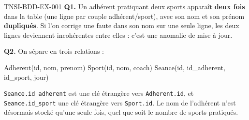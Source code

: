 \begin{corrige}{TNSI-BDD-EX-001}
\textbf{Q1.} Un adhérent pratiquant deux sports apparaît \textbf{deux fois} dans la table (une ligne par couple adhérent/sport), avec son nom et son prénom \textbf{dupliqués}. Si l'on corrige une faute dans son nom sur une seule ligne, les deux lignes deviennent incohérentes entre elles : c'est une anomalie de mise à jour.

\textbf{Q2.} On sépare en trois relations :
\begin{sql}
Adherent(id, nom, prenom)
Sport(id, nom, coach)
Seance(id, id_adherent, id_sport, jour)
\end{sql}
\texttt{Seance.id\_adherent} est une clé étrangère vers \texttt{Adherent.id}, et \texttt{Seance.id\_sport} une clé étrangère vers \texttt{Sport.id}. Le nom de l'adhérent n'est désormais stocké qu'une seule fois, quel que soit le nombre de sports pratiqués.
\end{corrige}
